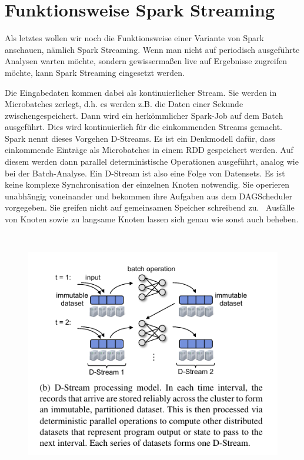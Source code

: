 \section[Funktionsweise Spark
Streaming]{\rmfamily Funktionsweise Spark
Streaming}
Als letztes wollen wir noch die Funktionsweise einer Variante von Spark
anschauen, nämlich Spark Streaming. Wenn man nicht auf periodisch
ausgeführte Analysen warten möchte, sondern gewissermaßen live auf
Ergebnisse zugreifen möchte, kann Spark Streaming eingesetzt werden.

Die Eingabedaten kommen dabei als kontinuierlicher Stream. Sie werden in
Microbatches zerlegt, d.h. es werden z.B. die Daten einer Sekunde
zwischengespeichert. Dann wird ein herkömmlicher Spark-Job auf dem
Batch ausgeführt. Dies wird kontinuierlich für die einkommenden Streams
gemacht. Spark nennt dieses Vorgehen D-Streams. Es ist ein Denkmodell
dafür, dass einkommende Einträge als Microbatches in einem RDD
gespeichert werden. Auf diesem werden dann parallel deterministische
Operationen ausgeführt, analog wie bei der Batch-Analyse. Ein D-Stream
ist also eine Folge von Datensets. Es ist keine komplexe
Synchronisation der einzelnen Knoten notwendig. Sie operieren
unabhängig voneinander und bekommen ihre Aufgaben aus dem DAGScheduler
vorgegeben. Sie greifen nicht auf gemeinsamen Speicher schreibend zu.
\ Ausfälle von Knoten sowie zu langsame Knoten lassen sich genau wie
sonst auch beheben. 

\begin{figure}
\centering
\includegraphics[width=13.227cm,height=10.793cm]{bilder/Seminartext-img4.png}
\end{figure}

